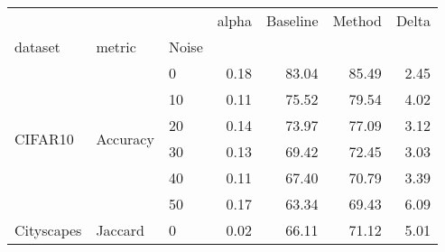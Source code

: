 \begin{tabular}{lllrrrr}
\toprule
 &  &  & alpha & Baseline & Method & Delta \\
dataset & metric & Noise &  &  &  &  \\
\midrule
\multirow[t]{6}{*}{CIFAR10} & \multirow[t]{6}{*}{Accuracy} & 0 & 0.18 & 83.04 & 85.49 & 2.45 \\
 &  & 10 & 0.11 & 75.52 & 79.54 & 4.02 \\
 &  & 20 & 0.14 & 73.97 & 77.09 & 3.12 \\
 &  & 30 & 0.13 & 69.42 & 72.45 & 3.03 \\
 &  & 40 & 0.11 & 67.40 & 70.79 & 3.39 \\
 &  & 50 & 0.17 & 63.34 & 69.43 & 6.09 \\
\cline{1-7} \cline{2-7}
Cityscapes & Jaccard & 0 & 0.02 & 66.11 & 71.12 & 5.01 \\
\cline{1-7} \cline{2-7}
\bottomrule
\end{tabular}
